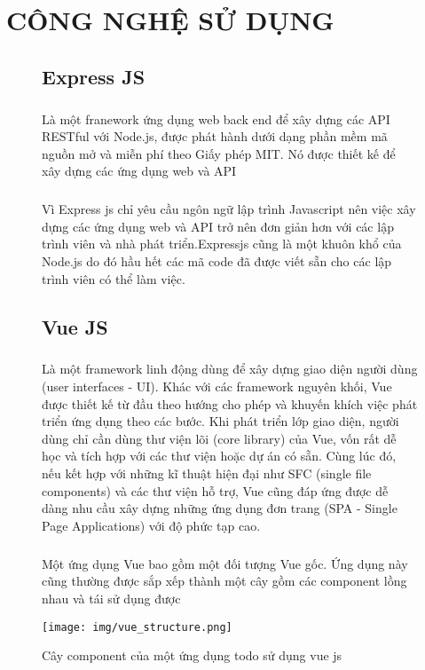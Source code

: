 \documentclass{report}
\begin{document}
\chapter{CÔNG NGHỆ SỬ DỤNG}
\begin{figure}[H]
\section{Express JS}
\fontsize{13}{15}\selectfont
	\paragraph{}
	Là một franework ứng dụng web back end để xây dựng các API RESTful với Node.js, được phát hành dưới dạng phần mềm mã nguồn mở và miễn phí theo Giấy phép MIT. Nó được thiết kế để xây dựng các ứng dụng web và API
	\paragraph{}	
	Vì Express js chỉ yêu cầu ngôn ngữ lập trình Javascript nên việc xây dựng các ứng dụng web và API trở nên đơn giản hơn với các lập trình viên và nhà phát triển.Expressjs cũng là một khuôn khổ của Node.js do đó hầu hết các mã code đã được viết sẵn cho các lập trình viên có thể làm việc.

\section{Vue JS}
\fontsize{13}{15}\selectfont
	\paragraph{}
	Là một framework linh động dùng để xây dựng giao diện người dùng (user interfaces - UI). Khác với các framework nguyên khối, Vue được thiết kế từ đầu theo hướng cho phép và khuyến khích việc phát triển ứng dụng theo các bước. Khi phát triển lớp giao diện, người dùng chỉ cần dùng thư viện lõi (core library) của Vue, vốn rất dễ học và tích hợp với các thư viện hoặc dự án có sẵn. Cùng lúc đó, nếu kết hợp với những kĩ thuật hiện đại như SFC (single file components) và các thư viện hỗ trợ, Vue cũng đáp ứng được dễ dàng nhu cầu xây dựng những ứng dụng đơn trang (SPA - Single Page Applications) với độ phức tạp cao.
	 \paragraph{}
	 Một ứng dụng Vue bao gồm một đối tượng Vue gốc. Ứng dụng này cũng thường được sắp xếp thành một cây gồm các component lồng nhau và tái sử dụng được
\end{figure}	
\begin{figure}[htp]
	\begin{center}
		\texttt{[image: img/vue\_structure.png]}		\linebreak
		\caption{Cây component của một ứng dụng todo sử dụng vue js}
	\end{center}
\end{figure}
\end{document}
